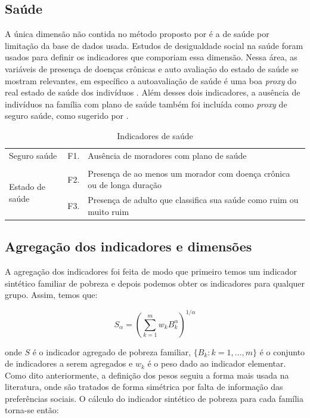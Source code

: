 \documentclass[
	12pt,				%
	openright,			%
	twoside,			%
	a4paper,			%
	english,			%
	french,				%
	spanish,			%
	brazil				%
	]{abntex2}
\begin{document}
\subsection{Saúde}
A única dimensão não contida no método proposto por  é a de saúde por limitação da base de dados usada. Estudos de desigualdade social na saúde foram usados para definir os indicadores que comporiam essa dimensão. Nessa área, as variáveis de presença de doenças crônicas e auto avaliação do estado de saúde se mostram relevantes, em específico a autoavaliação de saúde é uma boa \textit{proxy} do real estado de saúde dos indivíduos \cite{humphries2000income,diaz2003desigualdades}. Além desses dois indicadores, a ausência de indivíduos na família com plano de saúde também foi incluída como \textit{proxy} de seguro saúde, como sugerido por .

\begin{table}[H]
	\footnotesize
	\centering
	\caption{Indicadores de saúde}
	\label{ind_saude}
	\begin{tabular}{p{3.3cm}ll}
		\hline
		Seguro saúde                     & F1. & Ausência de moradores com plano de saúde                               \\
		&     &                                                                        \\
		\multirow{2}{*}{Estado de saúde} & F2. & Presença de ao menos um morador com doença crônica ou de longa duração \\
		& F3. & Presença de adulto que classifica sua saúde como ruim ou muito ruim   \\ \hline
	\end{tabular}
\end{table}
 
 \subsection{Agregação dos indicadores e dimensões}
 
 A agregação dos indicadores foi feita de modo que primeiro temos um indicador sintético familiar de pobreza e depois podemos obter os indicadores para qualquer grupo. Assim, temos que:
 
 \begin{equation}
 S_\alpha = (\sum_{k=1}^{m} w_k B^{\alpha}_k)^{1/\alpha}
 \end{equation}
 
 onde $S$ é o indicador agregado de pobreza familiar, $\{B_k: k=1,...,m\}$ é o conjunto de indicadores a serem agregados e $w_k$ é o peso dado ao indicador elementar. Como dito anteriormente, a definição dos pesos seguiu a forma mais usada na literatura, onde são tratados de forma simétrica por falta de informação das preferências sociais. O cálculo do indicador sintético de pobreza para cada família torna-se então:
 
\end{document}
